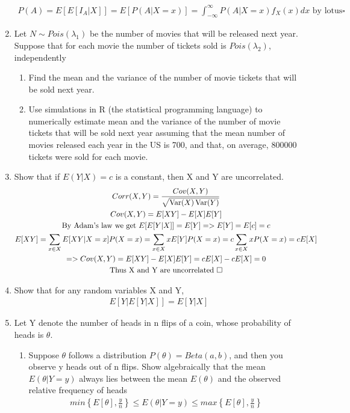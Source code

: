 \documentclass[11pt]{article}
\newcommand{\Var}{\mathop{\rm Var}}
\begin{document}
\begin{enumerate}
\begin{gather}
	 P(A)= E[E[I_A|X]]=E[P(A|X=x)] = \int_{-\infty}^{\infty}P(A|X=x)f_X(x)dx \text{ by lotus}\square	
\end{gather}
\item Let $N \sim Pois(\lambda_1)$ be the number of movies that will be released next year. Suppose that for each movie the number of tickets sold is $Pois(\lambda_2)$, independently
\begin{enumerate}
	\item Find the mean and the variance of the number of movie tickets that will be sold next year.
	\item Use simulations in R (the statistical programming language) to numerically estimate mean and the
	variance of the number of movie tickets that will be sold next year assuming that the mean number of movies
	released each year in the US is 700, and that, on average, 800000 tickets were sold for each movie.
\end{enumerate}
\item Show that if $E(Y | X) = c$ is a constant, then X and Y are uncorrelated.
\begin{gather}
	Corr(X,Y) = \frac{Cov(X,Y)}{\sqrt{\Var(X)\Var(Y)}}\\
	Cov(X,Y) = E[XY] - E[X]E[Y]\\
	\text{By Adam's law we get }E[E[Y|X]] = E[Y] => E[Y] = E[c] = c\\
	E[XY] = \sum_{x\in X}E[XY|X=x]P(X=x) = \sum_{x\in X}xE[Y]P(X=x) = c\sum_{x\in X}xP(X=x) = cE[X]\\
	=> Cov(X,Y) = E[XY] - E[X]E[Y] = cE[X]-cE[X] = 0\\
	\text{Thus X and Y are uncorrelated }\square
\end{gather}
\item Show that for any random variables X and Y,
\begin{gather}
	E[Y|E[Y|X]]=E[Y|X]
\end{gather}
\item Let Y denote the number of heads in n flips of a coin, whose probability of heads is $\theta$.
\begin{enumerate}
	\item Suppose $\theta$ follows a distribution $P(\theta) = Beta(a, b)$, and then you observe y heads out of n flips.
	Show algebraically that the mean $E(\theta | Y = y)$ always lies between the mean $E(\theta)$ and the observed
	relative frequency of heads
	\begin{gather}
		min\left\{E[\theta],\frac{y}{n}\right\}\le E(\theta | Y = y) \le max\left\{E[\theta],\frac{y}{n}\right\}

\end{gather}
\end{enumerate}
\end{enumerate}
\end{document}

